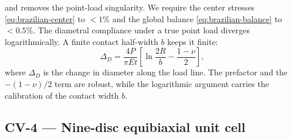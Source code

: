 and removes the point-load singularity. We require the center stresses
\eqref{eq:brazilian-center} to $<1\%$ and the global balance \eqref{eq:brazilian-balance}
to $<0.5\%$. The diametral compliance under a true point load diverges logarithmically. A
finite contact half-width $b$ keeps it finite:
\begin{equation}\label{eq:brazilian-compliance}
  \Delta_D = \frac{4P}{\pi E t}\!\left[\ln\frac{2R}{b}-\frac{1-\nu}{2}\right],
\end{equation}
where $\Delta_D$ is the change in diameter along the load line. The prefactor and the
$-(1-\nu)/2$ term are robust, while the logarithmic argument carries the calibration of the
contact width $b$.

\subsection{CV-4 --- Nine-disc equibiaxial unit cell}\label{app:ninedisc}

